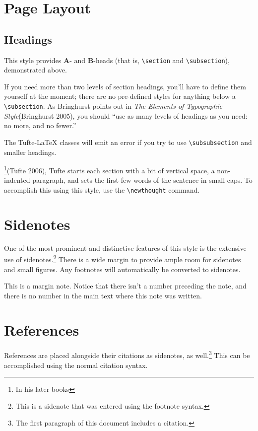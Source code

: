 \documentclass[
  twoside,
  symmetric]{tufte-book}
\begin{document}
\section{Page Layout}\label{sec:page-layout}

\subsection{Headings}\label{sec:headings}

This style provides \textbf{A}- and \textbf{B}-heads (that is,
\texttt{\textbackslash{}section} and
\texttt{\textbackslash{}subsection}), demonstrated above.

If you need more than two levels of section headings, you'll have to
define them yourself at the moment; there are no pre-defined styles for
anything below a \texttt{\textbackslash{}subsection}. As Bringhurst
points out in \emph{The Elements of Typographic Style}(Bringhurst 2005),
you should ``use as many levels of headings as you need: no more, and no
fewer.''

The Tufte-LaTeX classes will emit an error if you try to use
\texttt{\textbackslash{}subsubsection} and smaller headings.

\footnote{In his later books}(Tufte 2006), Tufte starts each section
with a bit of vertical space, a non-indented paragraph, and sets the
first few words of the sentence in small caps. To accomplish this using
this style, use the \texttt{\textbackslash{}newthought} command.

\section{Sidenotes}\label{sec:sidenotes}

One of the most prominent and distinctive features of this style is the
extensive use of sidenotes.\footnote{This is a sidenote that was entered
  using the footnote syntax.} There is a wide margin to provide ample
room for sidenotes and small figures. Any footnotes will automatically
be converted to sidenotes.

This is a margin note. Notice that there isn't a number preceding the
note, and there is no number in the main text where this note was
written.

\section{References}\label{references}

References are placed alongside their citations as sidenotes, as
well.\footnote{The first paragraph of this document includes a citation.}
This can be accomplished using the normal citation syntax.
\end{document}
